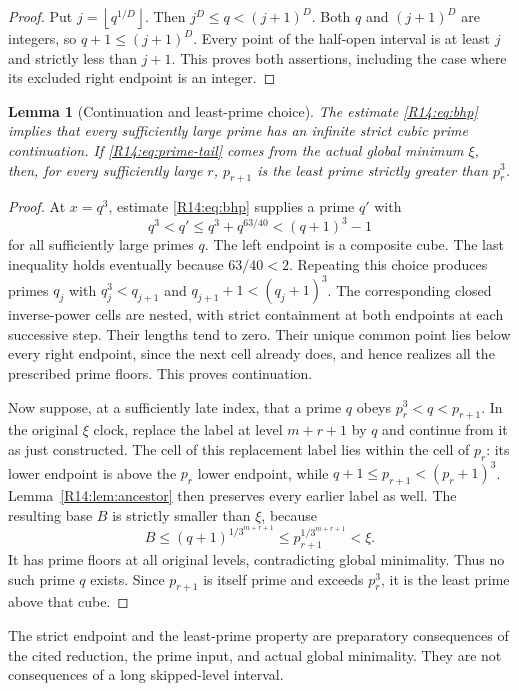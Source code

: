\documentclass[11pt,a4paper]{article}
\newtheorem{lemma}[theorem]{Lemma}\newtheorem{proposition}[theorem]{Proposition}
\theoremstyle{definition}\newtheorem{definition}[theorem]{Definition}
\theoremstyle{remark}\newtheorem{remark}[theorem]{Remark}
\newcommand{\floor}[1]{\left\lfloor#1\right\rfloor}
\begin{document}
\begin{proof}
Put $j=\floor{q^{1/D}}$. Then $j^D\le q<(j+1)^D$.
Both $q$ and $(j+1)^D$ are integers, so $q+1\le(j+1)^D$.
Every point of the half-open interval is at least $j$ and strictly
less than $j+1$. This proves both assertions, including the case
where its excluded right endpoint is an integer.
\end{proof}

\begin{lemma}[Continuation and least-prime choice]\label{R14:lem:least-prime}
The estimate \eqref{R14:eq:bhp} implies that every sufficiently large
prime has an infinite strict cubic prime continuation. If
\eqref{R14:eq:prime-tail} comes from the actual global minimum $\xi$,
then, for every sufficiently large $r$, $p_{r+1}$ is the least
prime strictly greater than $p_r^3$.
\end{lemma}

\begin{proof}
At $x=q^3$, estimate \eqref{R14:eq:bhp} supplies a prime $q'$ with
\[
 q^3<q'\le q^3+q^{63/40}<(q+1)^3-1
\]
for all sufficiently large primes $q$. The left endpoint is a
composite cube. The last inequality holds eventually because
$63/40<2$. Repeating this choice produces primes $q_j$ with
$q_j^3<q_{j+1}$ and $q_{j+1}+1<(q_j+1)^3$.
The corresponding closed inverse-power cells are nested, with
strict containment at both endpoints at each successive step.
Their lengths tend to zero. Their unique common point lies below
every right endpoint, since the next cell already does, and hence
realizes all the prescribed prime floors. This proves continuation.

Now suppose, at a sufficiently late index, that a prime $q$ obeys
$p_r^3<q<p_{r+1}$. In the original $\xi$ clock, replace the label
at level $m+r+1$ by $q$ and continue from it as just constructed.
The cell of this replacement label lies within the cell of $p_r$:
its lower endpoint is above the $p_r$ lower endpoint, while
$q+1\le p_{r+1}<(p_r+1)^3$. Lemma~\ref{R14:lem:ancestor} then
preserves every earlier label as well. The resulting base $B$ is
strictly smaller than $\xi$, because
\[
 B\le(q+1)^{1/3^{m+r+1}}
 \le p_{r+1}^{1/3^{m+r+1}}<\xi.
\]
It has prime floors at all original levels, contradicting global
minimality. Thus no such prime $q$ exists. Since $p_{r+1}$ is
itself prime and exceeds $p_r^3$, it is the least prime above that
cube.
\end{proof}

The strict endpoint and the least-prime property are preparatory
consequences of the cited reduction, the prime input, and actual
global minimality. They are not consequences of a long
skipped-level interval.
\end{document}
